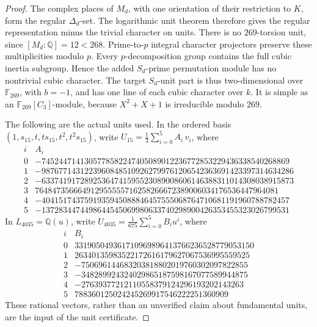 \begin{proof}
The complex places of \(M_d\), with one orientation of
their restriction to \(K\), form the regular \(\Delta_d\)-set.
The logarithmic unit theorem therefore gives the regular
representation minus the trivial character on units.
There is no \(269\)-torsion unit, since
\([M_d:\mathbb Q]=12<268\).
Prime-to-\(p\) integral character projectors preserve these
multiplicities modulo \(p\).
Every \(p\)-decomposition group contains the full cubic
inertia subgroup.  Hence the added \(S_d\)-prime permutation
module has no nontrivial cubic character.
The target \(S_d\)-unit part is thus two-dimensional over
\(\mathbb F_{269}\), with \(b=-1\), and has one line of
each cubic character over \(k\).
It is simple as an \(\mathbb F_{269}[C_3]\)-module, because
\(X^2+X+1\) is irreducible modulo \(269\).

The following are the actual units used.
In the ordered basis \((1,s_{15},t,ts_{15},t^2,t^2s_{15})\),
write \(U_{15}=\frac13\sum_{i=0}^5 A_i\,v_i\), where
\begingroup\small
\[
\begin{array}{c|r}
i&A_i\\ \hline
0&-7452447141305778582247405089012236772853229436338540268869\\
1&-98767714312239608485109262799761206542363691423397314634286\\
2&-63374191728925364741595523089008606146388311014308038915873\\
3&764847356664912955555716258266672389006034176536447964081\\
4&-4041517437591935945088846457555068764710681191960788782457\\
5&-1372834474498644545069980633740298900426353455323026799531
\end{array}
\]
\endgroup
In \(L_{4035}=\mathbb Q(u)\), write
\(U_{4035}=\frac1{675}\sum_{i=0}^5 B_i u^i\), where
\begingroup\small
\[
\begin{array}{c|r}
i&B_i\\ \hline
0&331905049361710969896413766236528779053150\\
1&26340135983522172616179627067536995559525\\
2&-750696144683203818802019760302097822855\\
3&-348289924324029865187598167077589944875\\
4&-27639377212110558379124296193202143263\\
5&788360125024245269917546222251360909
\end{array}
\]
\endgroup
These rational vectors, rather than an unverified claim
about fundamental units, are the input of the unit certificate.


\end{proof}
